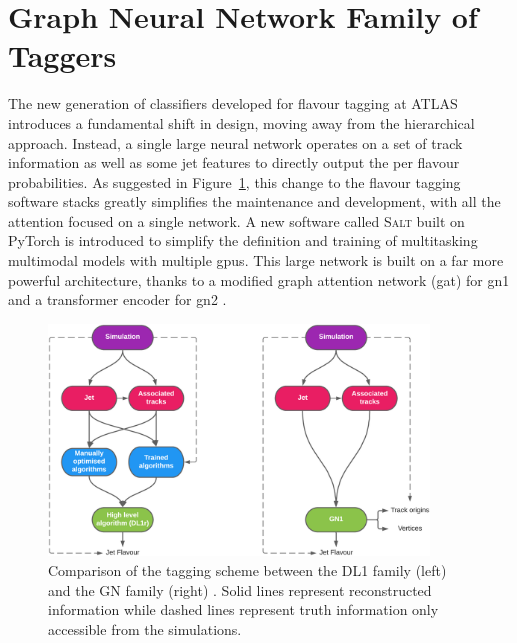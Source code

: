\section{Graph Neural Network Family of Taggers}\label{chap:GN}
The new generation of classifiers developed for flavour tagging at ATLAS introduces a fundamental shift in design, moving away from the hierarchical approach. Instead, a single large neural network operates on a set of track information as well as some jet features to directly output the per flavour probabilities. As suggested in Figure~\ref{fig:ftagArchi}, this change to the flavour tagging software stacks greatly simplifies the maintenance and development, with all the attention focused on a single network. A new software called \textsc{Salt} \cite{SaltCite} built on PyTorch \cite{pytorch} is introduced to simplify the definition and training of multitasking multimodal models with multiple \glspl{gpu}. This large network is built on a far more powerful architecture, thanks to a modified graph attention network (\gls{gat}) \cite{velickovic2018graph, brody2022how} for \gls{gn1} and a transformer encoder for \gls{gn2} \cite{NIPS_transformerPaper}. 

\begin{figure}[h!]
  \center
  \includegraphics[width=0.9\textwidth]{Images/FTAG/GN/Intro/schematics_difference.png}
  \caption{Comparison of the tagging scheme between the DL1 family (left) and the GN family (right) \cite{ATL-PHYS-PUB-2022-027}. Solid lines represent reconstructed information while dashed lines represent truth information only accessible from the simulations.} 
  \label{fig:ftagArchi}
\end{figure}

